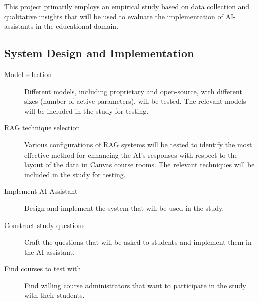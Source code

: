 

This project primarily employs an empirical study based on data collection and qualitative insights that will be used to evaluate the implementation of AI-assistants in the educational domain.


\subsection{System Design and Implementation}
\begin{description}
        \item[Model selection] Different models, including proprietary and open-source, with different sizes (number of active parameters), will be tested. The relevant models will be included in the study for testing.


        \item[RAG technique selection] Various configurations of \gls{RAG} systems will be tested to identify the most effective method for enhancing the AI's responses with respect to the layout of the data in Canvas course rooms. The relevant techniques will be included in the study for testing.


\item[Implement AI Assistant] Design and implement the system that will be used in the study.


\item[Construct study questions] Craft the questions that will be asked to students and implement them in the AI assistant.


\item[Find courses to test with] Find willing course administrators that want to participate in the study with their students.


\end{description}


